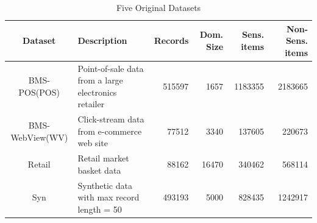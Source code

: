 \begin{table}[th]
\caption{Five Original Datasets}
\centering
\begin{tabular}{|c|l|r|r|r|r|} \hline
Dataset	& Description & Records & Dom. Size & Sens. items & Non-Sens. items  \\ \hline \hline
BMS-POS(POS) &Point-of-sale data from a large electronics retailer    &515597 & 1657&1183355 &  2183665\\ \hline
BMS-WebView(WV) &Click-stream data from e-commerce web site  &77512 & 3340& 137605 & 220673  \\ \hline
Retail &  Retail market basket data   & 88162&16470 &340462 & 568114  \\ \hline
Syn & Synthetic data with max record length = 50   & 493193 &5000 &828435 & 1242917 \\ \hline
\end{tabular}
\label{tab:datasets}
\end{table}



